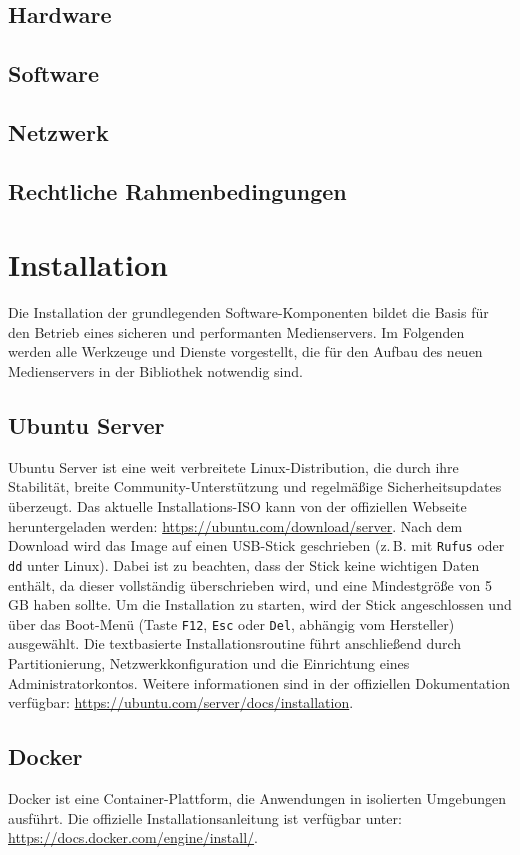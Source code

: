\documentclass[12pt,a4paper]{report}
\begin{document}
  \subsection{Hardware}
  \subsection{Software}
  \subsection{Netzwerk}
  \subsection{Rechtliche Rahmenbedingungen}
\section{Installation}  
Die Installation der grundlegenden Software-Komponenten bildet die Basis für den Betrieb eines sicheren und performanten Medienservers.  
Im Folgenden werden alle Werkzeuge und Dienste vorgestellt, die für den Aufbau des neuen Medienservers in der Bibliothek notwendig sind.

  \subsection{Ubuntu Server}  
  Ubuntu Server ist eine weit verbreitete Linux-Distribution, die durch ihre Stabilität, breite Community-Unterstützung und regelmäßige Sicherheitsupdates überzeugt.  
  Das aktuelle Installations-ISO kann von der offiziellen Webseite heruntergeladen werden: \url{https://ubuntu.com/download/server}.  
  Nach dem Download wird das Image auf einen USB-Stick geschrieben (z.\,B. mit \texttt{Rufus} oder \texttt{dd} unter Linux).  
  Dabei ist zu beachten, dass der Stick keine wichtigen Daten enthält, da dieser vollständig überschrieben wird, und eine Mindestgröße von 5\,GB haben sollte.    
  Um die Installation zu starten, wird der Stick angeschlossen und über das Boot-Menü (Taste \texttt{F12}, \texttt{Esc} oder \texttt{Del}, abhängig vom Hersteller) ausgewählt.  
  Die textbasierte Installationsroutine führt anschließend durch Partitionierung, Netzwerkkonfiguration und die Einrichtung eines Administratorkontos.  
  Weitere informationen sind in der offiziellen Dokumentation verfügbar: \url{https://ubuntu.com/server/docs/installation}.

  \subsection{Docker}  
  Docker ist eine Container-Plattform, die Anwendungen in isolierten Umgebungen ausführt.  
  Die offizielle Installationsanleitung ist verfügbar unter: \url{https://docs.docker.com/engine/install/}.  
\end{document}
